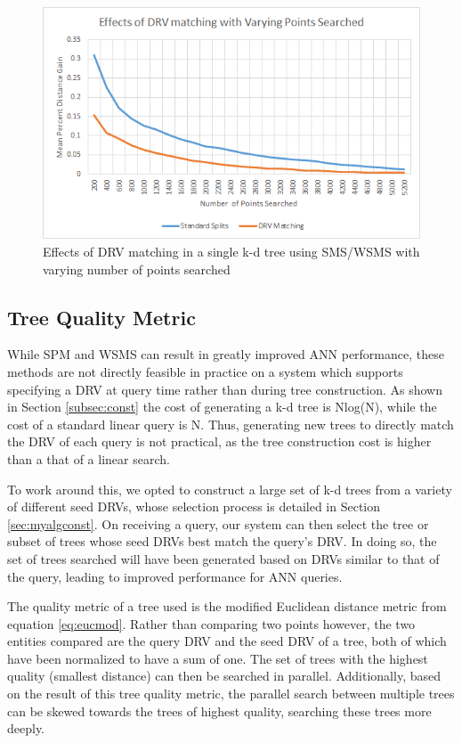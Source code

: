 \begin{figure}[h]
\begin{center}
\includegraphics[width=\textwidth]{Figures/sysdesc_drv_varying_points}
\end{center}
\caption{Effects of DRV matching in a single k-d tree using SMS/WSMS with varying number of points searched}
\label{fig:drv_varying_points}
\end{figure}

\subsection{Tree Quality Metric}

While SPM and WSMS can result in greatly improved ANN performance, these methods are not directly feasible in practice on a system which supports specifying a DRV at query time rather than during tree construction.  As shown in Section \ref{subsec:const} the cost of generating a k-d tree is Nlog(N), while the cost of a standard linear query is N.  Thus, generating new trees to directly match the DRV of each query is not practical, as the tree construction cost is higher than a that of a linear search.

To work around this, we opted to construct a large set of k-d trees from a variety of different seed DRVs, whose selection process is detailed in Section \ref{sec:myalgconst}.  On receiving a query, our system can then select the tree or subset of trees whose seed DRVs best match the query's DRV.  In doing so, the set of trees searched will have been generated based on DRVs similar to that of the query, leading to improved performance for ANN queries.

The quality metric of a tree used is the modified Euclidean distance metric from equation \ref{eq:eucmod}.  Rather than comparing two points however, the two entities compared are the query DRV and the seed DRV of a tree, both of which have been normalized to have a sum of one.  The set of trees with the highest quality (smallest distance) can then be searched in parallel.  Additionally, based on the result of this tree quality metric, the parallel search between multiple trees can be skewed towards the trees of highest quality, searching these trees more deeply.

